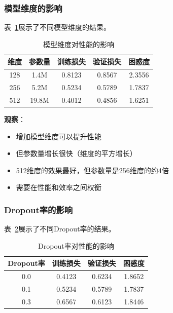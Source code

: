 \documentclass[UTF8,12pt,a4paper]{ctexart}
\begin{document}
\subsubsection{模型维度的影响}

表~\ref{tab:ablation_dim}展示了不同模型维度的结果。

\begin{table}[H]
\centering
\caption{模型维度对性能的影响}
\label{tab:ablation_dim}
\begin{tabular}{ccccc}
\toprule
\textbf{维度} & \textbf{参数量} & \textbf{训练损失} & \textbf{验证损失} & \textbf{困惑度} \\
\midrule
128 & 1.4M & 0.8123 & 0.8567 & 2.3556 \\
256 & 5.2M & 0.5234 & 0.5789 & 1.7837 \\
512 & 19.8M & 0.4012 & 0.4856 & 1.6251 \\
\bottomrule
\end{tabular}
\end{table}

\textbf{观察}：
\begin{itemize}
    \item 增加模型维度可以提升性能
    \item 但参数量增长很快（维度的平方增长）
    \item 512维度的效果最好，但参数量是256维度的约4倍
    \item 需要在性能和效率之间权衡
\end{itemize}

\subsubsection{Dropout率的影响}

表~\ref{tab:ablation_dropout}展示了不同Dropout率的结果。

\begin{table}[H]
\centering
\caption{Dropout率对性能的影响}
\label{tab:ablation_dropout}
\begin{tabular}{cccc}
\toprule
\textbf{Dropout率} & \textbf{训练损失} & \textbf{验证损失} & \textbf{困惑度} \\
\midrule
0.0 & 0.4123 & 0.6234 & 1.8652 \\
0.1 & 0.5234 & 0.5789 & 1.7837 \\
0.3 & 0.6567 & 0.6123 & 1.8446 \\
\bottomrule
\end{tabular}
\end{table}
\end{document}
